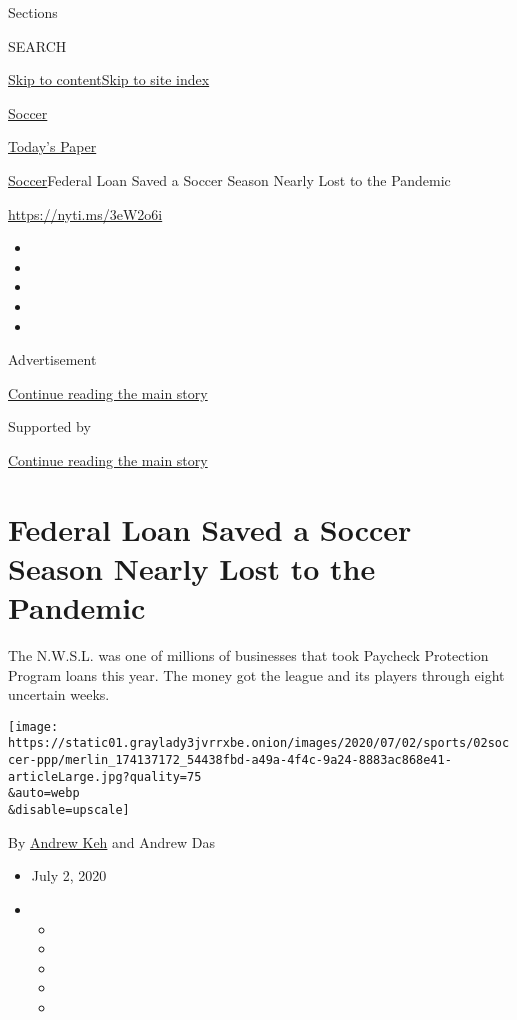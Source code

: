 Sections

SEARCH

\protect\hyperlink{site-content}{Skip to
content}\protect\hyperlink{site-index}{Skip to site index}

\href{https://www.nytimes3xbfgragh.onion/section/sports/soccer}{Soccer}

\href{https://myaccount.nytimes3xbfgragh.onion/auth/login?response_type=cookie\&client_id=vi}{}

\href{https://www.nytimes3xbfgragh.onion/section/todayspaper}{Today's
Paper}

\href{/section/sports/soccer}{Soccer}\textbar{}Federal Loan Saved a
Soccer Season Nearly Lost to the Pandemic

\url{https://nyti.ms/3eW2o6i}

\begin{itemize}
\item
\item
\item
\item
\item
\end{itemize}

Advertisement

\protect\hyperlink{after-top}{Continue reading the main story}

Supported by

\protect\hyperlink{after-sponsor}{Continue reading the main story}

\hypertarget{federal-loan-saved-a-soccer-season-nearly-lost-to-the-pandemic}{%
\section{Federal Loan Saved a Soccer Season Nearly Lost to the
Pandemic}\label{federal-loan-saved-a-soccer-season-nearly-lost-to-the-pandemic}}

The N.W.S.L. was one of millions of businesses that took Paycheck
Protection Program loans this year. The money got the league and its
players through eight uncertain weeks.

\texttt{[image: https://static01.graylady3jvrrxbe.onion/images/2020/07/02/sports/02soccer-ppp/merlin\_174137172\_54438fbd-a49a-4f4c-9a24-8883ac868e41-articleLarge.jpg?quality=75\\\&auto=webp\\\&disable=upscale]}

By \href{https://www.nytimes3xbfgragh.onion/by/andrew-keh}{Andrew Keh}
and Andrew Das

\begin{itemize}
\item
  July 2, 2020
\item
  \begin{itemize}
  \item
  \item
  \item
  \item
  \item
  \end{itemize}
\end{itemize}

